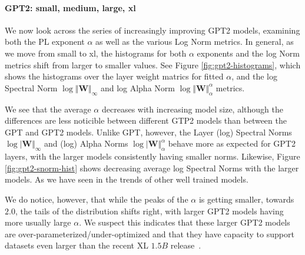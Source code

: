 \paragraph{GPT2: small, medium, large, xl} 

We now look across the series of increasingly improving GPT2 models, examining both the PL exponent $\alpha$ as well as the various Log Norm metrics.
In general, as we move from small to xl, the histograms for both $\alpha$ exponents and the log Norm metrics shift from larger to smaller values. 
See Figure \ref{fig:gpt2-histograms}, which shows the histograms over the layer weight matrics
for fitted $\alpha$, and the log Spectral Norm
 $\log\Vert\mathbf{W}\Vert_{\infty}$  
and log Alpha Norm
 $\log\Vert\mathbf{W}\Vert_{\alpha}^{\alpha}$ 
metrics.

We see that the average $\alpha$ decreases with increasing model size, although the differences are less noticible between different GTP2 models than between the GPT and GPT2 models.
Unlike GPT, however, the Layer (log) Spectral Norms $\log\vert\mathbf{W}\Vert_{\infty}$ 
and (log) Alpha Norms $\log\vert\mathbf{W}\Vert_{\alpha}^{\alpha}$
behave more as expected for GPT2 layers, with the larger models  consistently having  smaller norms. 
Likewise, Figure \ref{fig:gpt2-snorm-hist} shows decreasing average log Spectral Norms with the larger models.  
As we have seen in the trends of other well trained models.

We do notice, however, that while the peaks of the $\alpha$ is getting smaller, 
towards $2.0$,
the tails of the distribution shifts right, with larger GPT2 models having more
usually large $\alpha$.  
We suspect this indicates that these larger GPT2 models are over-parameterized/under-optimized and 
that they have capacity to support datasets even larger than the recent XL $1.5B$ release~\cite{gpt2-xl}.

